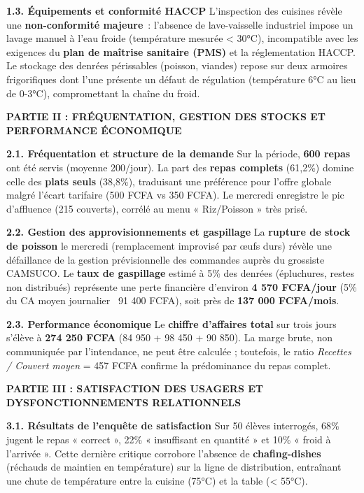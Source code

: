 \documentclass[11pt]{article}
\newcommand{\cle}[1]{{\popxbold\color{popdark}#1}}
\begin{document}
\begin{exoresolu}
\noindent \textbf{1.3. Équipements et conformité HACCP}
L'inspection des cuisines révèle une \textbf{non-conformité majeure}~: l'absence de lave-vaisselle industriel impose un lavage manuel à l'eau froide (température mesurée < 30°C), incompatible avec les exigences du \textbf{plan de maîtrise sanitaire (PMS)} et la réglementation HACCP. Le stockage des denrées périssables (poisson, viandes) repose sur deux armoires frigorifiques dont l'une présente un défaut de régulation (température 6°C au lieu de 0-3°C), compromettant la \cle{chaîne du froid}.

\noindent \textbf{PARTIE II : FRÉQUENTATION, GESTION DES STOCKS ET PERFORMANCE ÉCONOMIQUE}

\noindent \textbf{2.1. Fréquentation et structure de la demande}
Sur la période, \textbf{600 repas} ont été servis (moyenne 200/jour). La part des \textbf{repas complets} (61,2\%) domine celle des \textbf{plats seuls} (38,8\%), traduisant une préférence pour l'offre globale malgré l'écart tarifaire (500 FCFA vs 350 FCFA). Le mercredi enregistre le pic d'affluence (215 couverts), corrélé au menu « Riz/Poisson » très prisé.

\noindent \textbf{2.2. Gestion des approvisionnements et gaspillage}
La \textbf{rupture de stock de poisson} le mercredi (remplacement improvisé par œufs durs) révèle une défaillance de la \cle{gestion prévisionnelle des commandes} auprès du grossiste CAMSUCO. Le \textbf{taux de gaspillage} estimé à 5\% des denrées (épluchures, restes non distribués) représente une perte financière d'environ \textbf{4 570 FCFA/jour} (5\% du CA moyen journalier ~91 400 FCFA), soit près de \textbf{137 000 FCFA/mois}.

\noindent \textbf{2.3. Performance économique}
Le \textbf{chiffre d'affaires total} sur trois jours s'élève à \textbf{274 250 FCFA} (84 950 + 98 450 + 90 850). La marge brute, non communiquée par l'intendance, ne peut être calculée ; toutefois, le ratio \textit{Recettes / Couvert moyen} = 457 FCFA confirme la prédominance du repas complet.

\noindent \textbf{PARTIE III : SATISFACTION DES USAGERS ET DYSFONCTIONNEMENTS RELATIONNELS}

\noindent \textbf{3.1. Résultats de l'enquête de satisfaction}
Sur 50 élèves interrogés, 68\% jugent le repas « correct », 22\% « insuffisant en quantité » et 10\% « froid à l'arrivée ». Cette dernière critique corrobore l'absence de \textbf{chafing-dishes} (réchauds de maintien en température) sur la ligne de distribution, entraînant une chute de température entre la cuisine (75°C) et la table (< 55°C).


\end{exoresolu}
\end{document}
